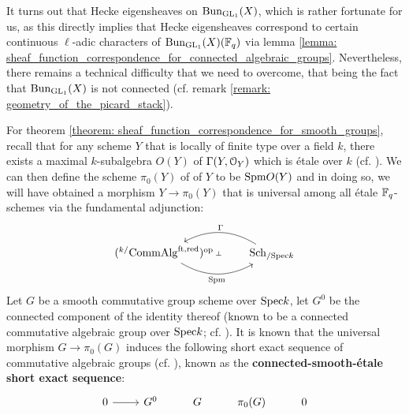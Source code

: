             It turns out that Hecke eigensheaves on $\Bun_{\GL_1}(X)$, which is rather fortunate for us, as this directly implies that Hecke eigensheaves correspond to certain continuous $\ell$-adic characters of $\Bun_{\GL_1}(X)(\F_q)$ via lemma \ref{lemma: sheaf_function_correspondence_for_connected_algebraic_groups}. Nevertheless, there remains a technical difficulty that we need to overcome, that being the fact that $\Bun_{\GL_1}(X)$ is not connected (cf. remark \ref{remark: geometry_of_the_picard_stack}).
            \begin{remark} \label{remark: the_connected_smooth_etale_short_exact_sequence}
                For theorem \ref{theorem: sheaf_function_correspondence_for_smooth_groups}, recall that for any scheme $Y$ that is locally of finite type over a field $k$, there exists a maximal $k$-subalgebra $O(Y)$ of $\Gamma(Y, \calO_Y)$ which is \'etale over $k$ (cf. \cite[Proposition 5.44]{milne_algebraic_groups}). We can then define the scheme $\pi_0(Y)$ of  of $Y$ to be $\Spm O(Y)$ and in doing so, we will have obtained a morphism $Y \to \pi_0(Y)$ that is universal among all \'etale $\F_q$-schemes via the fundamental adjunction:
                    $$
                        \begin{tikzcd}
                        	{({}^{k/}\Comm\Alg^{\ft, \red})^{\op}} & {\Sch_{/\Spec k}}
                        	\arrow[""{name=0, anchor=center, inner sep=0}, "{\Spm }"', bend right, from=1-1, to=1-2]
                        	\arrow[""{name=1, anchor=center, inner sep=0}, "\Gamma"', bend right, from=1-2, to=1-1]
                        	\arrow["\dashv"{anchor=center, rotate=-90}, draw=none, from=1, to=0]
                        \end{tikzcd}
                    $$
                Let $G$ be a smooth commutative group scheme over $\Spec k$, let $G^0$ be the connected component of the identity thereof (known to be a connected commutative algebraic group over $\Spec k$; cf. \cite[Lemma 3.2]{cunningham_roe_function_sheaf_dictionary_quasi_characters_p_adic_tori}). It is known that the universal morphism $G \to \pi_0(G)$ induces the following short exact sequence of commutative algebraic groups (cf. \cite[Proposition 5.48]{milne_algebraic_groups}), known as the \textbf{connected-smooth-\'etale short exact sequence}:
                    $$
                        \begin{tikzcd}
                        	0 & {G^0} & G & {\pi_0(G)} & 0
                        	\arrow[from=1-1, to=1-2]

\end{tikzcd}$$
\end{remark}
